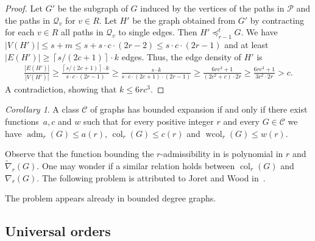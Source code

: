 \documentclass[1p,number,a4paper]{elsarticle}
\theoremstyle{remark}
\newcommand{\Cc}{\mathscr{C}}
\DeclareMathOperator{\col}{col}
\DeclareMathOperator{\wcol}{wcol}
\DeclareMathOperator{\adm}{adm}
\newtheorem{corollary}[theorem]{Corollary}
\newtheorem{problem}[theorem]{Problem}
\begin{document}
\begin{proof}
Let $G'$ be the subgraph of $G$ induced by the vertices of the paths in $\mathcal{P}$ and the paths in $\mathcal Q_v$ for $v\in R$. Let $H'$ be the graph obtained from $G'$ by
contracting for each $v\in R$ all paths in $\mathcal Q_v$ to single
edges. Then $H'\preceq^t_{r-1}G$. 
We have
$|V(H')|\leq s+m\leq s+s\cdot c\cdot(2r-2)\leq s\cdot c\cdot (2r-1)$
and at least
$|E(H')|\geq\left\lceil s/(2c+1)\right\rceil\cdot k$
edges. Thus, the edge density of $H'$ is
\begin{align*}
\frac{|E(H')|}{|V(H')|} \geq \frac{\left\lceil s/(2c+1)\right\rceil\cdot k}{s\cdot c\cdot (2r-1)}\geq \frac{s\cdot k}{s\cdot c\cdot (2c+1)\cdot (2r-1)}\geq \frac{6rc^3+1}{(2c^2+c)\cdot 2r}\geq \frac{6rc^3+1}{3c^2\cdot 2r}>c.
\end{align*}
A contradiction, showing that $k\leq 6rc^3$. 
\end{proof}



\begin{corollary}\label{lem:be-wcol}
 A class $\Cc$ of graphs has bounded expansion if and only
 if there exist functions~$a,c$ and $w$ such that for every positive
 integer $r$ and every $G\in \Cc$ we have
 $\adm_r(G)\leq a(r)$, $\col_r(G)\leq c(r)$ and $\wcol_r(G)\leq w(r)$.  
\end{corollary}

Observe that the function bounding the $r$-admissibility
in  is polynomial in $r$ and~$\widetilde\nabla_r(G)$. 
One may wonder if a similar relation holds between $\col_r(G)$ and $\nabla_r(G)$. The following problem is attributed to 
Joret and Wood in~\cite{esperet2018polynomial}. 



The problem appears already in bounded degree graphs. 



\subsection{Universal orders}\label{sec:uniform-orders}
\end{document}
